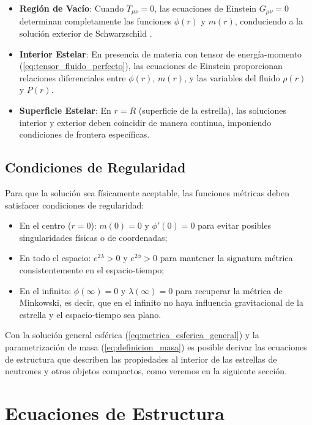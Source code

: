 \begin{itemize}
	\item \textbf{Región de Vacío}: Cuando $T_{\mu\nu} = 0$, las ecuaciones de Einstein $G_{\mu\nu} = 0$ determinan completamente las funciones $\phi(r)$ y $m(r)$, conduciendo a la solución exterior de Schwarzschild \cite{schwarzschildGravitationalFieldMass1999}.
	
	\item \textbf{Interior Estelar}: En presencia de materia con tensor de energía-momento (\ref{eq:tensor_fluido_perfecto}), las ecuaciones de Einstein proporcionan relaciones diferenciales entre $\phi(r)$, $m(r)$, y las variables del fluido $\rho(r)$ y $P(r)$.
	
	\item \textbf{Superficie Estelar}: En $r = R$ (superficie de la estrella), las soluciones interior y exterior deben coincidir de manera continua, imponiendo condiciones de frontera específicas.
\end{itemize}

\subsection{Condiciones de Regularidad}

Para que la solución sea físicamente aceptable, las funciones métricas deben satisfacer condiciones de regularidad:

\begin{itemize}
	\item En el centro ($r = 0$): $m(0) = 0$ y $\phi'(0) = 0$ para evitar posibles singularidades físicas o de coordenadas;
	\item En todo el espacio: $e^{2\lambda} > 0$ y $e^{2\phi} > 0$ para mantener la signatura métrica consistentemente en el espacio-tiempo;
	\item En el infinito: $\phi(\infty) = 0$ y $\lambda(\infty) = 0$ para recuperar la métrica de Minkowski, es decir, que en el infinito no haya influencia gravitacional de la estrella y el espacio-tiempo sea plano.
\end{itemize}

Con la solución general esférica (\ref{eq:metrica_esferica_general}) y la parametrización de masa (\ref{eq:definicion_masa}) es posible derivar las ecuaciones de estructura que describen las propiedades al interior de las estrellas de neutrones y otros objetos compactos, como veremos en la siguiente sección.

\section{Ecuaciones de Estructura}

